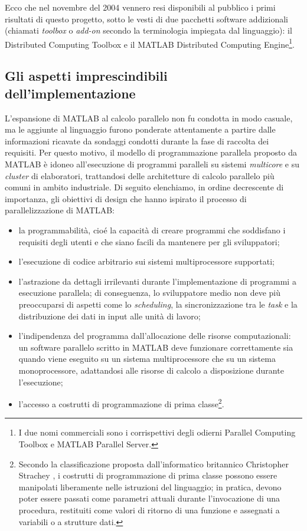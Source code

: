 Ecco che nel novembre del 2004 vennero resi disponibili al pubblico i primi risultati di questo progetto, sotto le vesti di due pacchetti software addizionali (chiamati \textit{toolbox} o \textit{add-on} secondo la terminologia impiegata dal linguaggio): il Distributed Computing 
Toolbox\textsuperscript{\texttrademark} e il MATLAB Distributed Computing Engine\textsuperscript{\texttrademark}\footnote{I due nomi commerciali sono i corrispettivi degli odierni Parallel 
Computing Toolbox\textsuperscript{\texttrademark} e MATLAB Parallel Server\textsuperscript{\texttrademark}.}.

\subsection{Gli aspetti imprescindibili dell'implementazione}
\label{sec2.1.2}
L'espansione di MATLAB al calcolo parallelo non fu condotta in modo casuale, ma le aggiunte al linguaggio furono ponderate attentamente a partire dalle informazioni ricavate da sondaggi condotti durante la fase di raccolta dei requisiti.\newline
Per questo motivo, il modello di programmazione parallela proposto da MATLAB \`e idoneo all'esecuzione di programmi paralleli su sistemi \textit{multicore} e su \textit{cluster} di elaboratori, trattandosi delle architetture di calcolo parallelo pi\`u comuni in ambito industriale.\newline
Di seguito elenchiamo, in ordine decrescente di importanza, gli obiettivi di design che hanno ispirato il processo di parallelizzazione di MATLAB:
\begin{itemize}
    \item la programmabilit\`a, cio\'e la capacit\`a di creare programmi che soddisfano i requisiti degli utenti e che siano facili da mantenere per gli sviluppatori;
    \item l'esecuzione di codice arbitrario sui sistemi multiprocessore supportati;
    \item l'astrazione da dettagli irrilevanti durante l'implementazione di programmi a esecuzione parallela; di conseguenza, lo sviluppatore medio non deve pi\`u preoccuparsi di aspetti come lo \textit{scheduling}, la sincronizzazione tra le \textit{task} e la distribuzione dei dati in input alle unit\`a di lavoro;
    \item l'indipendenza del programma dall'allocazione delle risorse computazionali: un software parallelo scritto in MATLAB deve funzionare correttamente sia quando viene eseguito su un sistema multiprocessore che su un sistema monoprocessore, adattandosi alle risorse di calcolo a disposizione durante l'esecuzione;
    \item l'accesso a costrutti di programmazione di prima classe\footnote{Secondo la classificazione proposta dall'informatico britannico Christopher Strachey \cite{SICP96}, i costrutti di programmazione di prima classe possono essere manipolati liberamente nelle istruzioni del linguaggio; in pratica, devono poter essere passati come parametri attuali durante l'invocazione di una procedura, restituiti come valori di ritorno di una funzione e assegnati a variabili o a strutture dati.}. 
\end{itemize}
